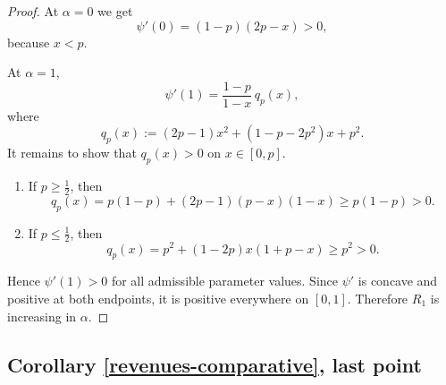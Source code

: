 \begin{proof}
\noindent At $\alpha=0$ we get
\begin{equation*}
    \psi'(0) = (1-p)(2p-x) > 0,
\end{equation*}
because $x < p$.

\noindent At $\alpha=1$,
\begin{equation*}
    \psi'(1) = \frac{1-p}{1-x} \, q_p(x),
\end{equation*}
where
\begin{equation*}
    q_p(x) := (2p-1)x^2 + (1-p-2p^2)x + p^2.
\end{equation*}
It remains to show that $q_p(x)>0$ on $x \in [0,p]$.

\begin{enumerate}
    \item If $p \geq \frac{1}{2}$, then
\begin{equation*}
    q_p(x) = p(1-p) + (2p-1)(p-x)(1-x) \geq p(1-p) > 0.
\end{equation*}

    \item If $p \leq \frac{1}{2}$, then
\begin{equation*}
    q_p(x) = p^2 + (1-2p)x(1+p-x) \geq p^2 > 0.
\end{equation*}
\end{enumerate}

\noindent Hence $\psi'(1)>0$ for all admissible parameter values. Since $\psi'$ is concave and positive at both endpoints, it is positive everywhere on $[0,1]$. Therefore $R_1$ is increasing in $\alpha$.
\end{proof}

\subsection*{Corollary \ref{revenues-comparative}, last point}

